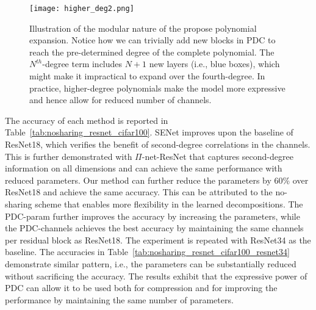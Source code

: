 \documentclass[runningheads]{llncs}
\newcommand{\resnet}{ResNet}
\newcommand{\modelres}{$\Pi$-net-\resnet}
\newcommand{\sne}{SENet}
\newcommand{\noshare}{PDC}
\providecommand\ie{i.e.,}
\begin{document}
\begin{figure}[t!]
  \centering
    \texttt{[image: higher\_deg2.png]}
    \caption{Illustration of the modular nature of the propose polynomial expansion. Notice how we can trivially add new blocks in \noshare{} to reach the pre-determined degree of the complete polynomial. The $N^{th}$-degree term includes $N+1$ new layers (\ie{} blue boxes), which might make it impractical to expand over the fourth-degree. In practice, higher-degree polynomials make the model more expressive and hence allow for reduced number of channels.}

  \label{fig:nosharing_higher_order_block}
\end{figure}


The accuracy of each method is reported in Table~\ref{tab:nosharing_resnet_cifar100}. \sne{} improves upon the baseline of \resnet18, which verifies the benefit of second-degree correlations in the channels. This is further demonstrated with \modelres{} that captures second-degree information on all dimensions and can achieve the same performance with reduced parameters. Our method can further reduce the parameters by 60\% over \resnet18 and achieve the same accuracy. This can be attributed to the no-sharing scheme that enables more flexibility in the learned decompositions. The \noshare-param further improves the accuracy by increasing the parameters, while the \noshare-channels achieves the best accuracy by maintaining the same channels per residual block as \resnet18. The experiment is repeated with \resnet34 as the baseline. The accuracies in Table~\ref{tab:nosharing_resnet_cifar100_resnet34} demonstrate similar pattern, \ie{} the parameters can be substantially reduced without sacrificing the accuracy. The results exhibit that the expressive power of \noshare{} can allow it to be used both for compression and for improving the performance by maintaining the same number of parameters. 
\end{document}
